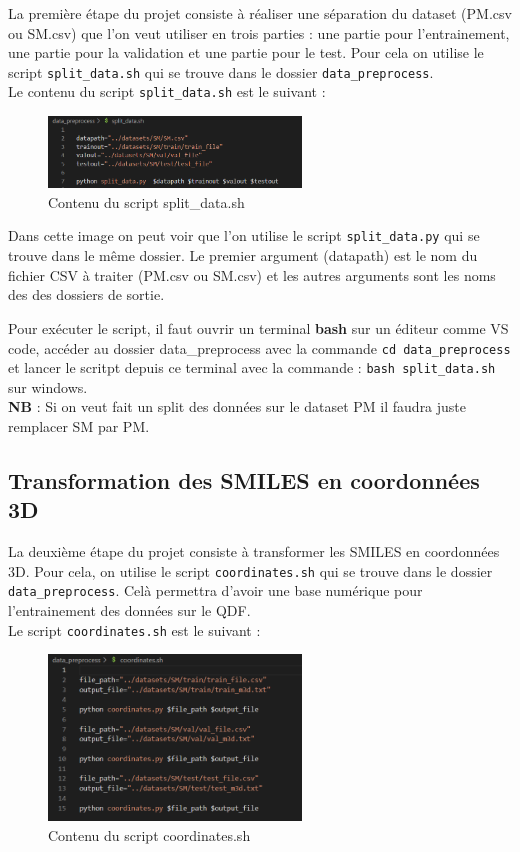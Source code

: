 La première étape du projet consiste à réaliser une séparation du dataset (PM.csv ou SM.csv) que l'on veut utiliser en trois parties : une partie pour l'entrainement, une partie pour la validation et une partie pour le test.
Pour cela on utilise le script \texttt{split\_data.sh} qui se trouve dans le dossier \texttt{data\_preprocess}.
\\
Le contenu du script \texttt{split\_data.sh} est le suivant :
\begin{figure}[htbp]
    \centering
    \includegraphics[width=0.6\textwidth]{GuideUtilisateur/split1.png}
    \caption{Contenu du script split\_data.sh}
\end{figure}

Dans cette image on peut voir que l'on utilise le script \texttt{split\_data.py} qui se trouve dans le même dossier. Le premier argument (datapath) est le nom du fichier CSV à traiter (PM.csv ou SM.csv) et les autres arguments sont les noms des des dossiers de sortie.

Pour exécuter le script, il faut ouvrir un terminal \textbf{bash} sur un éditeur comme VS code, accéder au dossier data\_preprocess avec la commande \texttt{cd data\_preprocess} et lancer le scritpt depuis ce terminal avec la commande : \texttt{bash split\_data.sh} sur windows. \\
\textbf{NB} : Si on veut fait un split des données sur le dataset PM il faudra juste remplacer SM par PM.

\subsection{Transformation des SMILES en coordonnées 3D}

La deuxième étape du projet consiste à transformer les SMILES en coordonnées 3D. Pour cela, on utilise le script \texttt{coordinates.sh} qui se trouve dans le dossier \texttt{data\_preprocess}.
Celà permettra d'avoir une base numérique pour l'entrainement des données sur le QDF.  \\
Le script \texttt{coordinates.sh} est le suivant :

\begin{figure}[H]
    \centering
    \includegraphics[width=0.6\textwidth]{GuideUtilisateur/coordinates1.png}
    \caption{Contenu du script coordinates.sh}
\end{figure}

